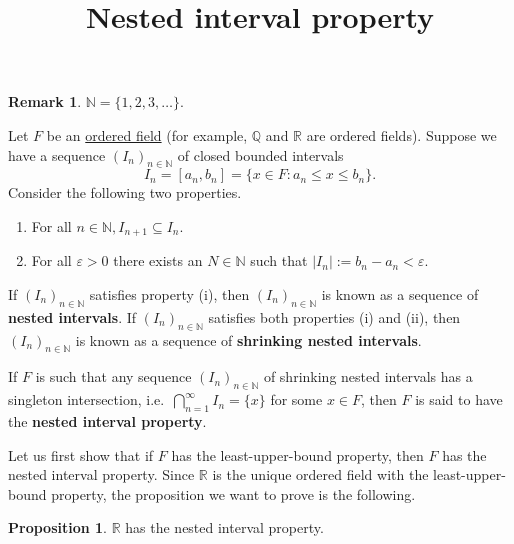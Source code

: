 \documentclass[12pt]{article}
\title{Nested interval property}
\author{}
\date{\vspace{-24mm}}
\theoremstyle{definition}
\newtheorem{proposition}[definition]{Proposition}
\newtheorem*{remark}{Remark}
\begin{document}
\begin{remark}
    \( \mathbb{N} = \{ 1, 2, 3, \ldots \} \).
\end{remark}

\noindent Let \( F \) be an \href{https://en.wikipedia.org/wiki/Ordered_field}{ordered field} (for example, \( \mathbb{Q} \) and \( \mathbb{R} \) are ordered fields). Suppose we have a sequence \( (I_n)_{n \in \mathbb{N}} \) of closed bounded intervals
\[
    I_n = [a_n, b_n] = \{ x \in F : a_n \leq x \leq b_n \}.
\]
Consider the following two properties.
\begin{enumerate}[label = (\roman*)]
    \item For all \( n \in \mathbb{N}, I_{n+1} \subseteq I_n \).

    \item For all \( \varepsilon > 0 \) there exists an \( N \in \mathbb{N} \) such that \( |I_n| := b_n - a_n < \varepsilon \).
\end{enumerate}

If \( (I_n)_{n \in \mathbb{N}} \) satisfies property (i), then \( (I_n)_{n \in \mathbb{N}} \) is known as a sequence of \textbf{nested intervals}. If \( (I_n)_{n \in \mathbb{N}} \) satisfies both properties (i) and (ii), then \( (I_n)_{n \in \mathbb{N}} \) is known as a sequence of \textbf{shrinking nested intervals}.

If \( F \) is such that any sequence \( (I_n)_{n \in \mathbb{N}} \) of shrinking nested intervals has a singleton intersection, i.e.\ \( \bigcap_{n=1}^{\infty} I_n = \{ x \} \) for some \( x \in F \), then \( F \) is said to have the \textbf{nested interval property}.

Let us first show that if \( F \) has the least-upper-bound property, then \( F \) has the nested interval property. Since \( \mathbb{R} \) is the unique ordered field with the least-upper-bound property, the proposition we want to prove is the following.

\begin{proposition}
\label{prop:R_has_nip}
    \( \mathbb{R} \) has the nested interval property.
\end{proposition}
\end{document}
